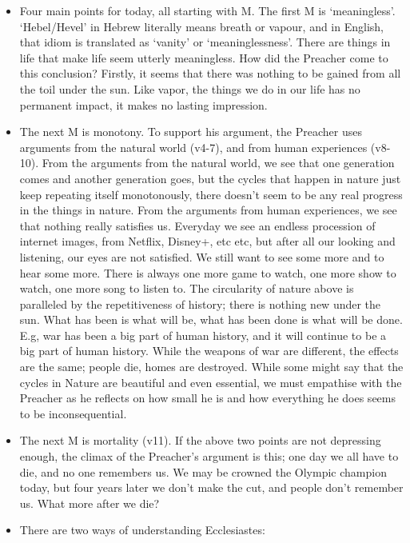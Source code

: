 \begin{itemize}
{  frustrated with how the action-consequence principle doesn't seem to apply
  in his day.}
  \item{Four main points for today, all starting with M.  The first M is
  `meaningless'.  `Hebel/Hevel' in Hebrew literally means breath or vapour,
  and in English, that idiom is translated as `vanity' or `meaninglessness'.
  There are things in life that make life seem utterly meaningless.  How did
  the Preacher come to this conclusion?  Firstly, it seems that there was
  nothing to be gained from all the toil under the sun.  Like vapor, the
  things we do in our life has no permanent impact, it makes no lasting
  impression.}
  \item{The next M is monotony.  To support his argument, the Preacher uses
  arguments from the natural world (v4-7), and from human experiences
  (v8-10).  From the arguments from the natural world, we see that one
  generation comes and another generation goes, but the cycles that happen in
  nature just keep repeating itself monotonously, there doesn't seem to be
  any real progress in the things in nature.  From the arguments from human
  experiences, we see that nothing really satisfies us.  Everyday we see an
  endless procession of internet images, from Netflix, Disney+, etc etc, but
  after all our looking and listening, our eyes are not satisfied.  We still
  want to see some more and to hear some more.  There is always one more game
  to watch, one more show to watch, one more song to listen to.  The
  circularity of nature above is paralleled by the repetitiveness of history;
  there is nothing new under the sun.  What has been is what will be, what
  has been done is what will be done.  E.g, war has been a big part of human
  history, and it will continue to be a big part of human history.  While the
  weapons of war are different, the effects are the same; people die, homes
  are destroyed.  While some might say that the cycles in Nature are
  beautiful and even essential, we must empathise with the Preacher as he
  reflects on how small he is and how everything he does seems to be
  inconsequential.}
  \item{The next M is mortality (v11).  If the above two points are not
  depressing enough, the climax of the Preacher's argument is this; one day
  we all have to die, and no one remembers us.  We may be crowned the Olympic
  champion today, but four years later we don't make the cut, and people
  don't remember us.  What more after we die?}
  \item{There are two ways of understanding Ecclesiastes:
}
\end{itemize}
